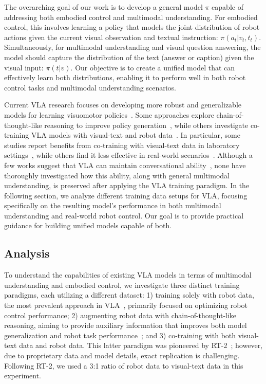 The overarching goal of our work is to develop a general model $\pi$ capable of addressing both embodied control and multimodal understanding.  For embodied control, this involves learning a policy that models the joint distribution of robot actions given the current visual observation and textual instruction: $\pi(a_{t}|v_{t},t_{t})$.  Simultaneously, for multimodal understanding and visual question answering, the model should capture the distribution of the text (answer or caption) given the visual input: $\pi(t|v)$.  Our objective is to create a unified model that can effectively learn both distributions, enabling it to perform well in both robot control tasks and multimodal understanding scenarios.

Current VLA research focuses on developing more robust and generalizable models for learning visuomotor policies~\cite{kim24openvla,[pi0,wen2024tinyvla}. Some approaches explore chain-of-thought-like reasoning to improve policy generation~\cite{ecot,diffusionvla,coa-vla}, while others investigate co-training VLA models with visual-text and robot data~\cite{pertsch2025fast}. In particular, some studies report benefits from co-training with visual-text data in laboratory settings~\cite{rt-2}, while others find it less effective in real-world scenarios~\cite{ecot}. Although a few works suggest that VLA can maintain conversational ability~\cite{diffusionvla,rt-2}, none have thoroughly investigated how this ability, along with general multimodal understanding, is preserved after applying the VLA training paradigm. In the following section, we analyze different training data setups for VLA, focusing specifically on the resulting model's performance in both multimodal understanding and real-world robot control. Our goal is to provide practical guidance for building unified models capable of both.



\subsection{Analysis}\label{sec:motivation}
To understand the capabilities of existing VLA models in terms of multimodal understanding and embodied control, we investigate three distinct training paradigms, each utilizing a different dataset: 1) training solely with robot data, the most prevalent approach in VLA~\cite{[pi0,openflamingo,kim24openvla,wen2024tinyvla}, primarily focused on optimizing robot control performance; 2) augmenting robot data with chain-of-thought-like reasoning, aiming to provide auxiliary information that improves both model generalization and robot task performance~\cite{diffusionvla,ecot}; and 3) co-training with both visual-text data and robot data. This latter paradigm was pioneered by RT-2~\cite{rt-2}; however, due to proprietary data and model details, exact replication is challenging. Following RT-2, we used a 3:1 ratio of robot data to visual-text data in this experiment.

